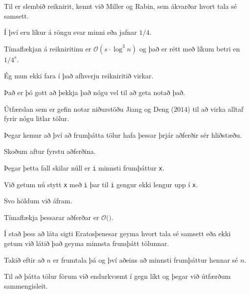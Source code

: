 {
    {
        \item<1-> Til er slembið reiknirit, kennt við Miller og Rabin, sem ákvarðar hvort tala sé samsett.
        \item<2-> Í því eru líkur á röngu svar minni eða jafnar $1/4$.
        \item<3-> Tímaflækjan á reikniritinu er $\mathcal{O}(s \cdot \log^3 n)$ og það er rétt með líkum betri en $1/4^s$.
        \item<4-> Ég mun ekki fara í það afhverju reikniritið virkar.
        \item<5-> Það er þó gott að þekkja það nógu vel til að geta notað það.
        \item<6-> Útfærslan sem er gefin notar niðurstöðu Jiang og Deng ($2014$) til að virka alltaf fyrir nógu litlar tölur.
    }
}

{
}

{
    {
        \item<1-> Þegar kemur að því að frumþátta tölur hafa þessar þrjár aðferðir sér hliðstæðu.
        \item<2-> Skoðum aftur fyrstu aðferðina.
        \item<3->[] 
        \item<4-> Þegar þetta fall skilar núll er \texttt{i} minnsti frumþáttur \texttt{x}.
        \item<5-> Við getum nú stytt \texttt{x} með \texttt{i} þar til \texttt{i} gengur ekki lengur upp í \texttt{x}.
        \item<6-> Svo höldum við áfram.
    }
}

{
    {
        \item<1->[] 
        \item<2-> Tímaflækja þessarar aðferðar er $\mathcal{O}($$)$.
    }
}

{
    {
        \item<1-> Í stað þess að láta sigti Eratosþenesar geyma hvort tala sé samsett eða ekki getum við látið það geyma minnsta frumþátt tölunnar.
        \item<2-> Takið eftir að $n$ er frumtala þá og því aðeins að minnsti frumþáttur hennar sé $n$.
        \item<3-> Til að þátta tölur förum við endurkvæmt í gegn líkt og þegar við útfærðum sammengisleit.
    }
}

